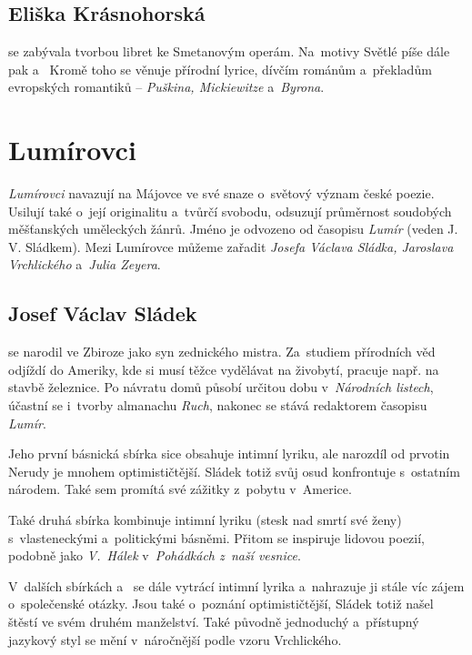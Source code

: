 \subsection*{Eliška Krásnohorská}
 se zabývala tvorbou libret ke Smetanovým
operám. Na~motivy Světlé píše  dále pak 
a~ Kromě toho se věnuje přírodní lyrice, dívčím
románům a~překladům evropských romantiků -- \emph{Puškina, Mickiewitze}
a~\emph{Byrona}.

\section{Lumírovci}
\emph{Lumírovci} navazují na Májovce ve své snaze o~světový význam české
poezie. Usilují také o~její originalitu a~tvůrčí svobodu, odsuzují
průměrnost soudobých měšťanských uměleckých žánrů. Jméno je odvozeno od
časopisu \emph{Lumír} (veden J. V. Sládkem). Mezi Lumírovce můžeme
zařadit \emph{Josefa Václava Sládka, Jaroslava Vrchlického}
a~\emph{Julia Zeyera}.

\subsection*{Josef Václav Sládek}
 se narodil ve Zbiroze jako syn zednického
mistra. Za~studiem přírodních věd odjíždí do Ameriky, kde si musí těžce
vydělávat na živobytí, pracuje např. na stavbě železnice. Po návratu
domů působí určitou dobu v~\emph{Národních listech}, účastní se i~tvorby
almanachu \emph{Ruch}, nakonec se stává redaktorem časopisu \emph{Lumír}.

Jeho první básnická sbírka  sice obsahuje intimní lyriku,
ale narozdíl od prvotin Nerudy je mnohem optimističtější. Sládek totiž
svůj osud konfrontuje s~ostatním národem. Také sem promítá své zážitky
z~pobytu v~Americe.

Také druhá sbírka  kombinuje intimní lyriku (stesk
nad smrtí své ženy) s~vlasteneckými a~politickými básněmi. Přitom se
inspiruje lidovou poezií, podobně jako \emph{V.~Hálek} v~\emph{Pohádkách z~naší
vesnice}.

V~dalších sbírkách  
 a~ se dále vytrácí intimní
lyrika a~nahrazuje ji stále víc zájem o~společenské otázky. Jsou také
o~poznání optimističtější, Sládek totiž našel štěstí ve svém druhém
manželství. Také původně jednoduchý a~přístupný jazykový styl se mění
v~náročnější podle vzoru Vrchlického.

